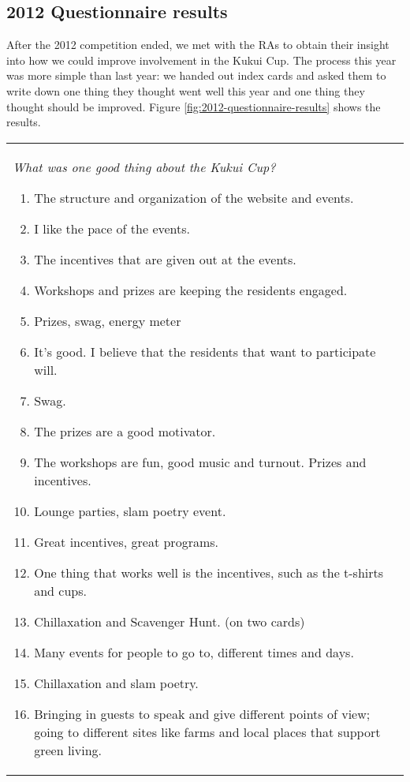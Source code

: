 \documentclass[]{article}
\begin{document}
\subsection{2012 Questionnaire results}

After the 2012 competition ended, we met with the RAs to obtain their insight into how we could
improve involvement in the Kukui Cup.   The process this year was more simple than last year: we handed
out index cards and asked them to write down one thing they thought went well this year
and one thing they thought should be improved.   Figure \ref{fig:2012-questionnaire-results} shows
the results. 


\begin{figure*}[th!]
\begin{tabular}{|l|l|}
\hline

\small  \begin{minipage}[t]{2.6in}
{\em What was one good thing about the Kukui Cup?}
\begin{enumerate}
\item The structure and organization of the website and events.
\item I like the pace of the events.
\item The incentives that are given out at the events. 
\item Workshops and prizes are keeping the residents engaged.
\item Prizes, swag, energy meter
\item It's good. I believe that the residents that want to participate will.
\item Swag.
\item The prizes are a good motivator. 
\item The workshops are fun, good music and turnout. Prizes and incentives.
\item 	Lounge parties, slam poetry event.
\item 	Great incentives, great programs.
\item 	One thing that works well is the incentives, such as the t-shirts and cups.
\item 	Chillaxation and Scavenger Hunt. (on two cards)
\item 	Many events for people to go to, different times and days.
\item 	Chillaxation and slam poetry.
\item 	Bringing in guests to speak and give different points of view; going to different sites like farms and local places that support green living.

\end{enumerate}
\end{minipage}
\end{tabular}
\end{figure*}
\end{document}
